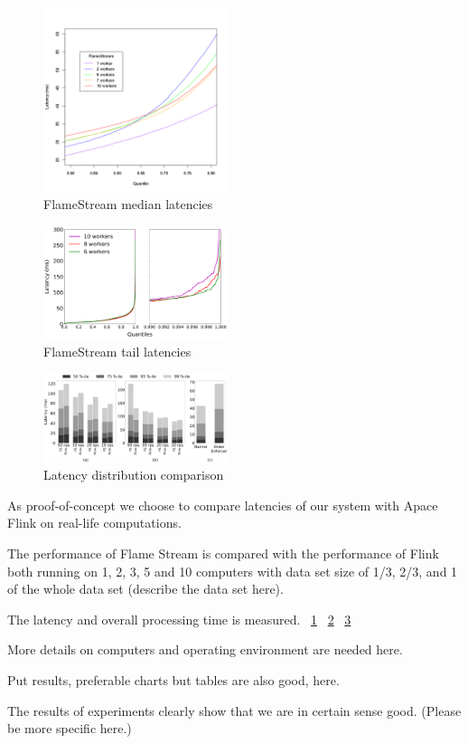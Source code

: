 
\label {fs-experiments-section}

\begin{figure}[htbp]
  \centering
  \includegraphics[width=0.48\textwidth]{pics/fs-index-median}
  \caption{FlameStream median latencies}
  \label {fs-index-median}
\end{figure}

\begin{figure}[htbp]
  \centering
  \includegraphics[width=0.48\textwidth]{pics/fs-index-quantiles}
  \caption{FlameStream tail latencies}
  \label {fs-index-quantiles}
\end{figure}

\begin{figure}[htbp]
  \centering
  \includegraphics[width=0.48\textwidth]{pics/comp-index-quantiles}
  \caption{Latency distribution comparison}
  \label {comp-index-quantiles}
\end{figure}

As proof-of-concept we choose to compare latencies of our system with Apace Flink on real-life computations.

The performance of Flame Stream is compared with the performance of Flink both running on 1, 2, 3, 5 and 10 computers with data set size of 1/3, 2/3, and 1 of the whole data set  (describe the data set here).

The latency and overall processing time is measured. 
~\ref{fs-index-median}
~\ref{fs-index-quantiles}
~\ref{comp-index-quantiles}

More details on computers and operating environment are needed here.

Put results, preferable charts but tables are also good, here.

The results of experiments clearly show that we are in certain sense good.  (Please be more specific here.)

